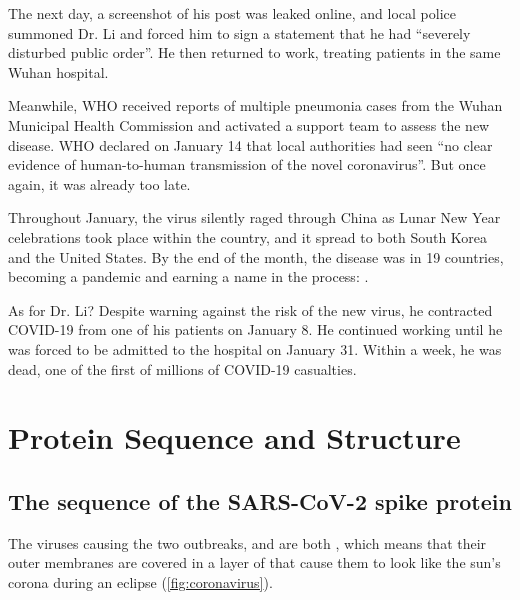 The next day, a screenshot of his post was leaked online, and local police summoned Dr. Li and forced him to sign a statement that he had ``severely disturbed public order''. He then returned to work, treating patients in the same Wuhan hospital.

Meanwhile, WHO received reports of multiple pneumonia cases from the Wuhan Municipal Health Commission and activated a support team to assess the new disease. WHO declared on January 14 that local authorities had seen ``no clear evidence of human-to-human transmission of the novel coronavirus''. But once again, it was already too late.

Throughout January, the virus silently raged through China as Lunar New Year celebrations took place within the country, and it spread to both South Korea and the United States. By the end of the month, the disease was in 19 countries, becoming a pandemic and earning a name in the process: .

As for Dr. Li? Despite warning against the risk of the new virus, he contracted COVID-19 from one of his patients on January 8. He continued working until he was forced to be admitted to the hospital on January 31. Within a week, he was dead, one of the first of millions of COVID-19 casualties.\\

\FloatBarrier
{}
\section{Protein Sequence and Structure}

\FloatBarrier
{}
\subsection{The sequence of the SARS-CoV-2 spike protein}

The viruses causing the two outbreaks,  and  are both , which means that their outer membranes are covered in a layer of  that cause them to look like the sun's corona during an eclipse (\autoref{fig:coronavirus}).

